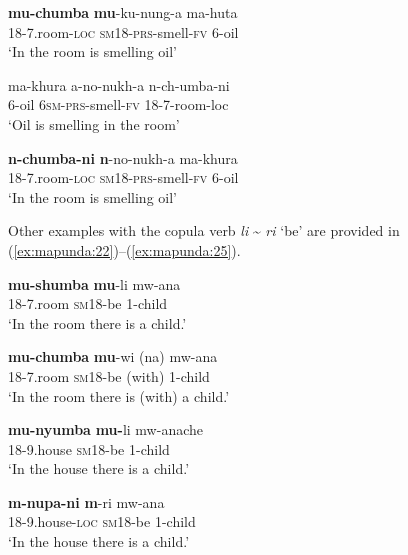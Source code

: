 \documentclass[output=paper ]{langscibook}
\begin{document}
    \ex\label{ex:mapunda:20b} \gll  \textbf{mu-chumba}    \textbf{mu}{}-ku-nung-a    ma-huta  \\
                      18-7.room-\textsc{loc}  \textsc{sm18}{}-\textsc{prs}{}-smell-\textsc{fv}  6-oil\\
                \glt  ‘In the room is smelling oil’
    \z

\ex 
\label{ex:mapunda:21}
    \ea\label{ex:mapunda:21a} \gll ma-khura  a-no-nukh-a    n-ch-umba-ni \\
                          6-oil    \textsc{6sm-prs}{}-smell-\textsc{fv}  18-7-room-loc\\ \jambox*{[Makhuwa]}
                            \glt  ‘Oil is smelling in the room’

    \ex\label{ex:mapunda:21b} \gll  \textbf{n-chumba-ni}   \textbf{n}{}-no-nukh-a    ma-khura \\
                      18-7.room-\textsc{loc}  \textsc{sm18}{}-\textsc{prs}{}-smell-\textsc{fv}  6-oil\\
                        \glt  ‘In the room is smelling oil’
    \z
\z

Other examples with the copula verb \textit{li} {\textasciitilde} \textit{ri} ‘be’ are provided in (\ref{ex:mapunda:22})--(\ref{ex:mapunda:25}). 


\ea 
\label{ex:mapunda:22} \gll \textbf{mu-shumba}  \textbf{mu}{}-li    mw-ana\\ 
                            18-7.room  \textsc{sm18}{}-be  1-child\\ \jambox*{[Bena]}
                    \glt ‘In the room there is a child.’


\ex\label{ex:mapunda:23} 
\gll \textbf{mu-chumba}  \textbf{mu}{}-wi    (na)  mw-ana\\ 
18-7.room  \textsc{sm18}{}-be   (with)   1-child\\ \jambox*{[Ngoni]}
\glt ‘In the room there is (with) a child.’


\ex\label{ex:mapunda:24} 
\gll \textbf{mu-nyumba}  \textbf{mu-}li    mw-anache \\ 
18-9.house  \textsc{sm18}{}-be  1-child\\\jambox*{[Yao]}
\glt ‘In the house there is a child.’


\ex
\label{ex:mapunda:25}
\gll \textbf{m-nupa-ni}    \textbf{m}{}-ri    mw-ana \\ 
18-9.house-\textsc{loc}    \textsc{sm18}{}-be  1-child \\ \jambox*{[Makhuwa]}
\glt ‘In the house there is a child.’
\z
\end{document}
